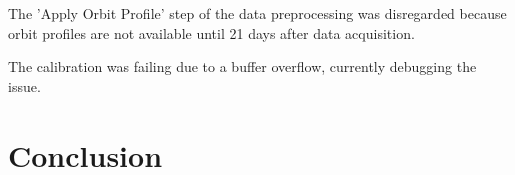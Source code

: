 \documentclass[conference]{IEEEtran}
\begin{document}
	The 'Apply Orbit Profile' step of the data preprocessing was disregarded because orbit profiles are not available until 21 days after data acquisition.
	
	The calibration was failing due to a buffer overflow, currently debugging the issue.


	\section{Conclusion}
	





	\nocite{*}
	\printbibliography
	
\end{document}
